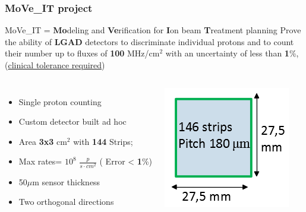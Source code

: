 \documentclass[aspectratio=169]{beamer}
\begin{document}
	\begin{frame}
	\frametitle{MoVe\_IT project}
	\begin{center}
		{\Large \color{blue} MoVe\_IT = \textbf{Mo}deling and \textbf{Ve}rification for \textbf{I}on beam \textbf{T}reatment planning }
		\newline
		Prove the ability of \textbf{LGAD} detectors to discriminate individual protons and to count their number up to fluxes of \textbf{100} MHz/cm$^2$ with an uncertainty of {\color{blue}less than \textbf{1}\%}, (\underline{clinical tolerance required})
	\end{center}
	\begin{columns}
		\begin{itemize}
			\item Single proton counting
			\item Custom detector built ad hoc
			\item Area \textbf{3x3} cm${}^2$ with \textbf{144} Strips;
			\item Max rates= $10^8$ $\frac{p}{s \cdot cm^2}$ ({\color{blue} Error < \textbf{1}\%})
			\item 50$\mu$m sensor thickness
			\item Two orthogonal directions
		\end{itemize}
		\begin{center}
			\includegraphics[width=0.7 \textwidth]{IMG/Detector.PNG}
		\end{center}
	\end{columns}
	\end{frame}
\end{document}
